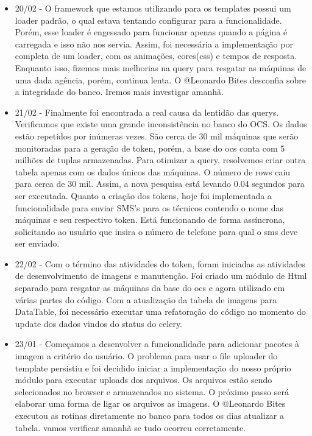 \begin{itemize}
    \item 20/02 -
  O framework que estamos utilizando para os templates possui um loader padrão, o qual estava tentando configurar para a funcionalidade. Porém, esse loader é engessado para funcionar apenas quando a página é carregada e isso não nos servia. Assim, foi necessária a implementação por completa de um loader, com as animações, cores(css) e tempos de resposta.
  Enquanto isso, fizemos mais melhorias na query para resgatar as máquinas de uma dada agência, porém, continua lenta. O @Leonardo Bites desconfia sobre a integridade do banco. Iremos mais investigar amanhã.


    \item 21/02 -
  Finalmente foi encontrada a real causa da lentidão das querys. Verificamos que existe uma grande inconsistência no banco do OCS. Os dados estão repetidos por inúmeras vezes. São cerca de 30 mil máquinas que serão monitoradas para a geração de token, porém, a base do ocs conta com 5 milhões de tuplas armazenadas. Para otimizar a query, resolvemos criar outra tabela apenas com os dados únicos das máquinas. O número de rows caiu para cerca de 30 mil. Assim, a nova pesquisa está levando 0.04 segundos para ser executada.
  Quanto a criação dos tokens, hoje foi implementada a funcionalidade para enviar SMS's para os técnicos contendo o nome das máquinas e seu respectivo token. Está funcionando de forma assíncrona, solicitando ao usuário que insira o número de telefone para qual o sms deve ser enviado.


    \item 22/02 -
  Com o término das atividades do token, foram iniciadas as atividades de desenvolvimento de imagens e manutenção. Foi criado um módulo de Html separado para resgatar as máquinas da base do ocs e agora utilizado em várias partes do código.
  Com a atualização da tabela de imagens para DataTable, foi necessário executar uma refatoração do código no momento do update dos dados vindos do status do celery.


    \item 23/01 -
  Começamos a desenvolver a funcionalidade para adicionar pacotes à imagem a critério do usuário. O problema para usar o file uploader do template persistiu e foi decidido iniciar a implementação do nosso próprio módulo para executar uploads dos arquivos. Os arquivos estão sendo selecionados no browser e armazenados no sistema. O próximo passo será elaborar uma forma de ligar os arquivos as imagens.
  O @Leonardo Bites executou as rotinas diretamente no banco para todos os dias atualizar a tabela. vamos verificar amanhã se tudo ocorreu corretamente.



\end{itemize}
